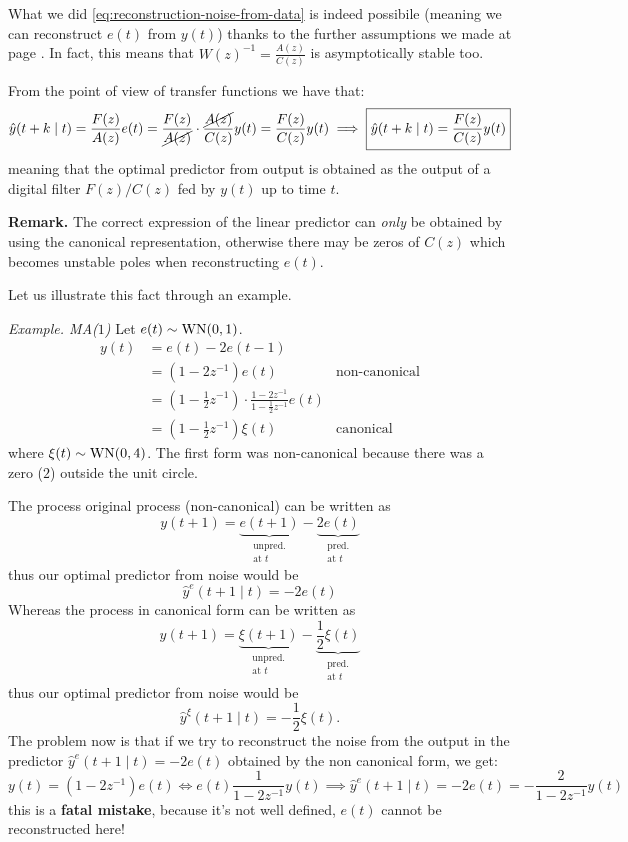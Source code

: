
What we did \eqref{eq:reconstruction-noise-from-data} is indeed possibile (meaning we can reconstruct $e(t)$ from $y(t)$) thanks to the further assumptions we made at page \pageref{assumptions-prediction-theory}. In fact, this means that $W(z)^{-1}=\frac{A(z)}{C(z)}$ is asymptotically stable too.

From the point of view of transfer functions we have that:
\[
	\hat y (t+k\mid t) = \frac{F(z)}{A(z)}e(t) =\frac{F(z)}{\cancel{A(z)}}\cdot\frac{\cancel{A(z)}}{C(z)}y(t) =\frac{F(z)}{C(z)}y(t) \implies \boxed{\hat y (t+k\mid t) = \frac{F(z)}{C(z)}y(t)}
\]
meaning that the optimal predictor from output is obtained as the output of a digital filter $F(z)/C(z)$ fed by $y(t)$ up to time $t$.

\textbf{Remark.}
The correct expression of the linear predictor can \emph{only} be obtained by using the canonical representation, otherwise there may be zeros of $C(z)$ which becomes unstable poles when reconstructing $e(t)$.

Let us illustrate this fact through an example.

\emph{Example. MA($1$)}
Let $e(t)\sim \operatorname{WN}(0,1)$.
\begin{align*}
	y(t) &= e(t) - 2 e(t-1)\\
	&= (1-2z^{-1} )e(t) &\text{non-canonical}\\
	&=\left( 1-\frac{1}{2} z^{-1}  \right) \cdot\frac{1-2z^{-1}}{1-\frac{1}{2} z^{-1}} e(t)\\
	&=\left( 1-\frac{1}{2} z^{-1}  \right) \xi(t) &\text{canonical}
\end{align*}
where $\xi(t)\sim \operatorname{WN}(0,4)$. The first form was non-canonical because there was a zero ($2$) outside the unit circle.

The process original process (non-canonical) can be written as
\[
	y(t+1)=\underbrace{e(t+1)}_{\substack{\text{unpred.}\\\text{at $t$}}}-\underbrace{2e(t)}_{\substack{\text{pred.}\\\text{at $t$}}}
\]
thus our optimal predictor from noise would be
\[
	\hat y^{e} (t+1\mid t) = -2e(t)
\]
Whereas the process in canonical form can be written as 
\[
	y(t+1) =\underbrace{\xi(t+1)}_{\substack{\text{unpred.}\\\text{at $t$}}}-\underbrace{\frac{1}{2} \xi(t)}_{\substack{\text{pred.}\\\text{at $t$}}}
\]
thus our optimal predictor from noise would be
\[
	\hat y^{\xi} (t+1\mid t)=-\frac{1}{2} \xi(t).
\]
The problem now is that if we try to reconstruct the noise from the output in the predictor $\hat y^{e} (t+1\mid t) = -2e(t)$ obtained by the non canonical form, we get:
\[
	y(t)=(1-2z^{-1})e(t) \iff e(t) \frac{1}{1-2z^{-1}} y(t) \implies \hat y^{e} (t+1\mid t) = -2e(t) = -\frac{2}{1-2z^{-1}}y(t)
\]
this is a \textbf{fatal mistake}, because it's not well defined, $e(t)$ cannot be reconstructed here!

